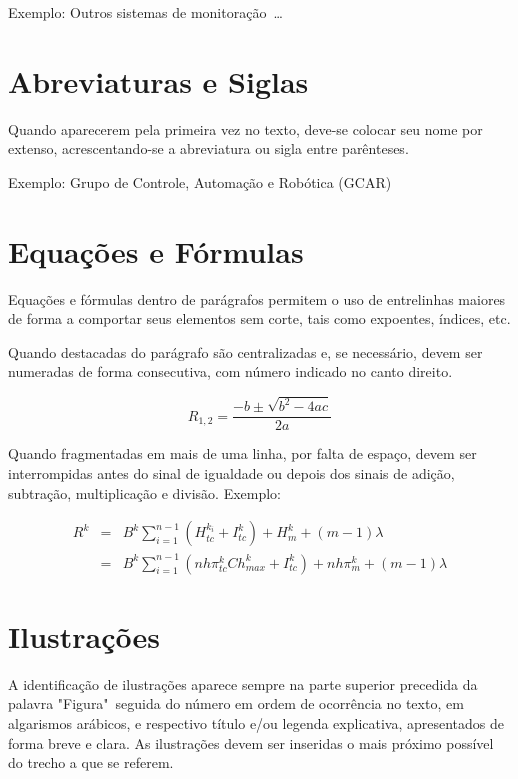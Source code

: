 \documentclass[repeatfields,xlists,xpacks,oneside]{ufrgscca}
\begin{document}
Exemplo: Outros sistemas de
monitoração~\cite{Baturone:DCIS1996-231,Cota:TIM-49-2}\ldots\\

\section{Abreviaturas e Siglas}

Quando aparecerem pela primeira vez no texto, deve-se colocar seu nome por
extenso, acrescentando-se a abreviatura ou sigla entre parênteses.

Exemplo:   Grupo de Controle, Automação e Robótica (GCAR)

\section{Equações e Fórmulas}

Equações e fórmulas dentro de parágrafos permitem o uso de entrelinhas
maiores de forma a comportar seus elementos sem corte, tais como expoentes,
índices, etc.

Quando destacadas do parágrafo são centralizadas e, se necessário, devem ser
numeradas de forma consecutiva, com número indicado no canto direito.

\begin{equation}
R_{1,2}=\frac{-b\pm\sqrt{b^2-4ac}}{2a}
\end{equation}

Quando fragmentadas em mais de uma linha, por falta de espaço, devem ser
interrompidas antes do sinal de igualdade ou depois dos sinais de adição,
subtração, multiplicação e divisão. Exemplo:

\begin{eqnarray}
R^k &=& B^k \sum_{i=1}^{n-1}{\left(H_{tc}^{k_i}+I_{tc}^k\right)}+H_m^k+(m-1)\lambda \nonumber\\
&=& B^k \sum_{i=1}^{n-1}{\left(nh\pi_{tc}^kCh_{max}^k+I_{tc}^k\right)}+nh\pi_m^k+(m-1)\lambda
\end{eqnarray}


\section{Ilustrações}

A identificação de ilustrações aparece sempre na parte superior precedida da
palavra "Figura"\ seguida do número em ordem de ocorrência no texto, em
algarismos arábicos, e respectivo título e/ou legenda explicativa,
apresentados de forma breve e clara. As ilustrações devem ser inseridas o
mais próximo possível do trecho a que se referem.
\end{document}
